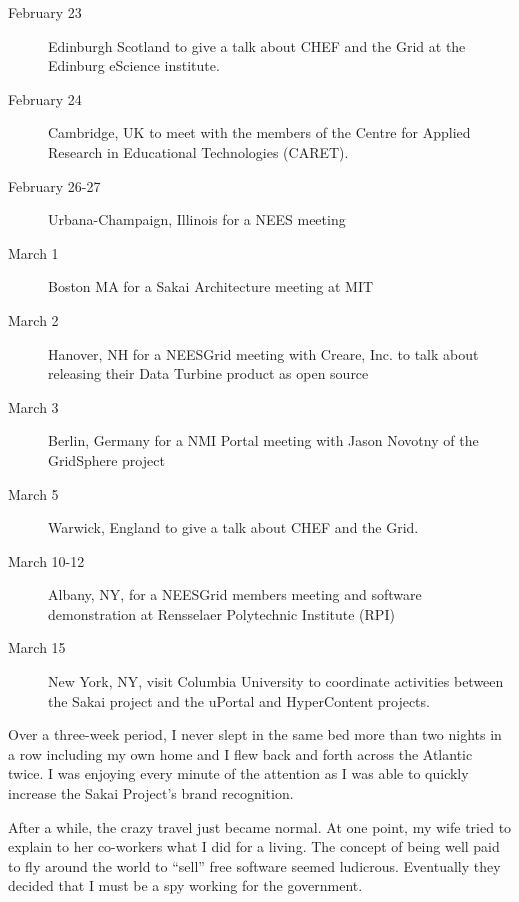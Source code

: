 \documentclass[12pt]{book}
\begin{document}
\begin{description}
\item[February 23] Edinburgh Scotland to give a talk about CHEF and the Grid
at the Edinburg eScience institute.

\item[February 24] Cambridge, UK to meet with the members of the Centre for
Applied Research in Educational Technologies (CARET).

\item[February 26-27] Urbana-Champaign, Illinois for a NEES meeting

\item[March 1] Boston MA for a Sakai Architecture meeting at MIT

\item[March 2] Hanover, NH for a NEESGrid meeting with Creare, Inc. to talk about
releasing their Data Turbine product as open source

\item[March 3] Berlin, Germany for a NMI Portal meeting with Jason Novotny of the
GridSphere project

\item[March 5] Warwick, England to give a talk about CHEF and the Grid.

\item[March 10-12] Albany, NY, for a NEESGrid members meeting and software demonstration
at Rensselaer Polytechnic Institute (RPI)

\item[March 15] New York, NY, visit Columbia University to coordinate activities between
the Sakai project and the uPortal and HyperContent projects.

\end{description}

Over a three-week period, I never slept in the same bed more than two nights
in a row including my own home and I flew back and forth across the
Atlantic twice. I was enjoying every minute of the attention as I was able to quickly
increase the Sakai Project's brand recognition.

After a while, the crazy travel just became normal.  At one
point, my wife tried to explain to her co-workers what I
did for a living.  The concept of being well paid to fly around
the world to ``sell'' free software seemed ludicrous.
Eventually they decided that I must be a spy working
for the government.

\end{document}
